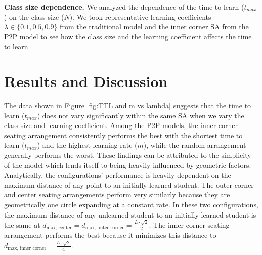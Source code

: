 \documentclass[10pt,a4paper,twoside]{article}
\begin{document}
\noindent \textbf{Class size dependence.} We analyzed the dependence of the time to learn ($t_{max}$) on the class size ($N$). We took representative learning coefficients $\lambda \in \lbrace 0.1, 0.5, 0.9 \rbrace$ from the traditional model and the inner corner SA from the P2P model to see how the class size and the learning coefficient affects the time to learn. %

\section{Results and Discussion}
The data shown in Figure \ref{fig:TTL and m vs lambda} suggests that the time to learn ($t_{max}$) does not vary significantly within the same SA when we vary the class size and learning coefficient. Among the P2P models, the inner corner seating arrangement consistently performs the best with the shortest time to learn ($t_{max}$) and the highest learning rate ($m$), while the random arrangement generally performs the worst. These findings can be attributed to the simplicity of the model which lends itself to being heavily influenced by geometric factors. Analytically, the configurations’ performance is heavily dependent on the maximum distance of any point to an initially learned student. The outer corner and center seating arrangements perform very similarly because they are geometrically one circle expanding at a constant rate. In these two configurations, the maximum distance of any unlearned student to an initially learned student is the same at $d_{\text{max, center}} = d_{\text{max, outer corner}}=\frac{L\cdot\sqrt{2}}{2}$. The inner corner seating arrangement performs the best because it minimizes this distance to $d_{\text{max, inner corner}}=\frac{L\cdot\sqrt{2}}{4}$.
\end{document}
